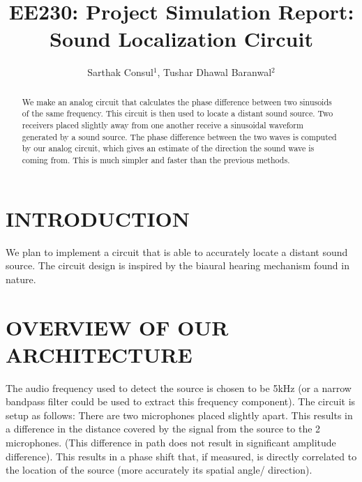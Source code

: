 \documentclass[]{risa}
\begin{document}
%
\title{EE230: Project Simulation Report: \\
Sound Localization Circuit}

\author {Sarthak Consul$^{1}$,
Tushar Dhawal Baranwal$^{2}$} 

\begin{abstract}
We make an analog circuit that calculates the phase difference between two sinusoids of the same frequency. This circuit is then used to locate a distant sound source. Two receivers placed slightly away from one another receive a sinusoidal waveform generated by a sound source. The phase difference between the two waves is computed by our analog circuit, which gives an estimate of the direction the sound wave is coming from. This is much simpler and faster than the previous methods. 
\end{abstract}

\maketitle

\section{INTRODUCTION}
We plan to implement a circuit that is able to accurately locate a distant sound source. The circuit design is inspired by the biaural hearing mechanism found in nature.\\


\section{OVERVIEW OF OUR ARCHITECTURE}
The audio frequency used to detect the source is chosen to be 5kHz (or a narrow bandpass filter could be used to extract this frequency component). The circuit is setup as follows: There are two microphones placed slightly apart. This results in a difference in the distance covered by the signal from the source to the 2 microphones. (This difference in path does not result in significant amplitude difference). This results in a phase shift that, if measured, is directly correlated to the location of the source (more accurately its spatial angle/ direction).
\end{document}
